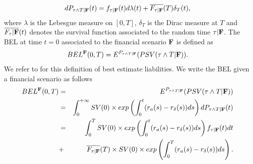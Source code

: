 \begin{equation}\label{realSurrenderTimePDF}
dP_{\tau\land T|\bold{F}}(t)=f_{\tau|\bold{F}}(t)d\lambda(t)+\overline{F_{\tau|\bold{F}}}(T)\delta_{T}(t),
\end{equation}
where $\lambda$ is the Lebesgue measure on $[0,T]$, $\delta_{T}$ is the Dirac measure at $T$ and $\overline{F_{\tau}|\bold{F}}(t)$ denotes the survival function associated to the random time $\tau|\bold{F}$. The BEL at time $t=0$ associated to the financial scenario $\bold{F}$ is defined as
\begin{equation}\label{BELDefinition}
BEL^{\bold{F}}(0,T)=E^{P_{\tau\land T|\bold{F}}}(PSV(\tau\land T|\bold{F})).
\end{equation}
We refer to \citet{Ge90,PlThJu11} for this definition of best estimate liabilities. 
We write the BEL given a financial scenario as follows
\begin{eqnarray}
BEL^{\bold{F}}(0,T)&=&E^{P_{\tau\land T|\bold{F}}}(PSV(\tau\land T|\bold{F}))\nonumber\\
&=&\int^{+\infty}_{0}SV(0)\times exp\left(\int^{t}_{0}(r_{a}(s)-r_{\delta}(s))ds\right)dP_{\tau\land T|\bold{F}}(t)\nonumber\\
&=&\int^{T}_{0}SV(0)\times exp\left(\int^{t}_{0}(r_{a}(s)-r_{\delta}(s))ds\right)f_{\tau|\bold{F}}(t)dt\nonumber\\
&+&\overline{F_{\tau|\bold{F}}}(T)\times SV(0)\times exp\left(\int^{T}_{0}(r_{a}(s)-r_{\delta}(s))ds\right).\label{BELOneScenario}
\end{eqnarray}
